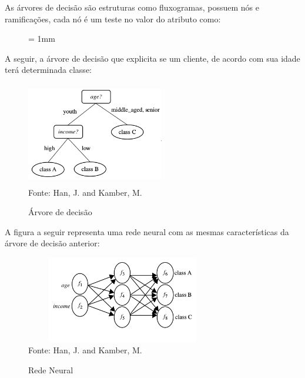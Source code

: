 As árvores de decisão são estruturas como fluxogramas, possuem nós e ramificações, 
cada nó é um teste no valor do atributo como:
\singlespace

\begin{figure}[ht] \unitlength= 1mm \thicklines
\end{figure}

\vspace{20mm}
  
A seguir, a árvore de decisão que explicita se um cliente, de acordo com sua idade terá determinada classe:
\begin{figure}[!ht]
\centering
\caption{Árvore de decisão}
\includegraphics[width=60mm, height=45mm]{Figuras/BigData/arvorejovem.png}\\
\tiny Fonte: Han, J. and Kamber, M. 
\end{figure}  

A figura a seguir representa uma rede neural com as mesmas características da árvore de decisão anterior:
\begin{figure}[!ht]
\centering
\caption{Rede Neural}
\includegraphics[width=85mm, height=38mm]{Figuras/BigData/redeneural.png}\\
\tiny Fonte: Han, J. and Kamber, M. 
\end{figure}  

